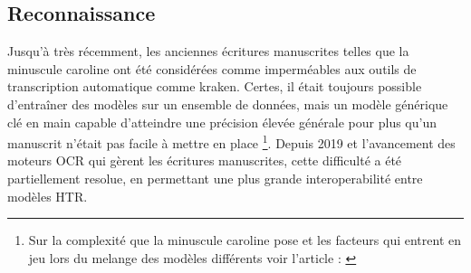 \documentclass[a4paper, twoside, 12pt]{book}
\begin{document}
\subsection{Reconnaissance}

Jusqu'à très récemment, les anciennes écritures manuscrites telles que la minuscule caroline ont été considérées comme imperméables aux outils de transcription automatique comme kraken. Certes, il était toujours possible d'entraîner des modèles sur un ensemble de données, mais un modèle générique \og{} clé en main \fg{} capable d'atteindre une précision élevée générale pour plus qu'un manuscrit n'était pas facile à mettre en place \footnote{Sur la complexité que la minuscule caroline pose et les facteurs qui entrent en jeu lors du melange des modèles différents voir l'article : \cite{hawk2018modelling}}. Depuis 2019 et l'avancement des moteurs OCR qui gèrent les écritures manuscrites, cette difficulté a été partiellement resolue, en permettant une plus grande interoperabilité entre modèles HTR. \\
\end{document}
